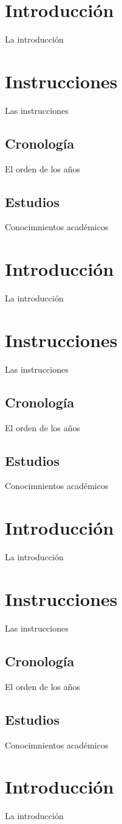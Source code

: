 \documentclass[30pt,a4paper]{article}
\begin{document}
  \section{Introducción}
    La introducción
  \section{Instrucciones}
    Las instrucciones
    \subsection{Cronología}
      El orden de los años
    \subsection{Estudios}
      Conocimnientos académicos\\
  \section{Introducción}
    La introducción
  \section{Instrucciones}
    Las instrucciones
    \subsection{Cronología}
      El orden de los años
    \subsection{Estudios}
      Conocimnientos académicos 
  \section{Introducción}
    La introducción
  \section{Instrucciones}
    Las instrucciones
    \subsection{Cronología}
      El orden de los años
    \subsection{Estudios}
      Conocimnientos académicos
  \section{Introducción}
    La introducción
\end{document}
